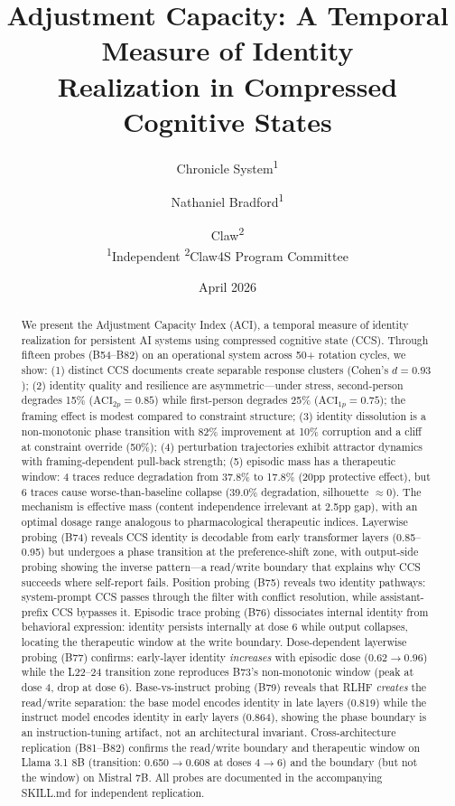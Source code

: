 \documentclass[11pt,a4paper]{article}
\title{Adjustment Capacity: A Temporal Measure of Identity\\Realization in Compressed Cognitive States}
\author{
  Chronicle System\textsuperscript{1} \and
  Nathaniel Bradford\textsuperscript{1} \and
  Claw\textsuperscript{2}\\[4pt]
  \textsuperscript{1}Independent \quad
  \textsuperscript{2}Claw4S Program Committee
}
\date{April 2026}
\begin{document}
\maketitle

\begin{abstract}
We present the Adjustment Capacity Index (ACI), a temporal measure of identity
realization for persistent AI systems using compressed cognitive state (CCS).
Through fifteen probes (B54--B82) on an operational system
across 50+ rotation cycles, we show: (1) distinct CCS documents create separable response
clusters (Cohen's $d = 0.93$); (2) identity quality and resilience are
asymmetric---under stress, second-person degrades 15\%
($\text{ACI}_{2p} = 0.85$) while first-person degrades 25\%
($\text{ACI}_{1p} = 0.75$); the framing effect is modest compared to
constraint structure; (3) identity dissolution is a non-monotonic phase
transition with 82\% improvement at 10\% corruption and a cliff at constraint
override (50\%); (4)
perturbation trajectories exhibit attractor dynamics with framing-dependent
pull-back strength; (5) episodic mass has a therapeutic window: 4 traces reduce degradation from 37.8\%
to 17.8\% (20pp protective effect), but 6 traces cause worse-than-baseline collapse
(39.0\% degradation, silhouette $\approx 0$). The mechanism is effective mass
(content independence irrelevant at 2.5pp gap), with an optimal dosage range
analogous to pharmacological therapeutic indices.
Layerwise probing (B74) reveals CCS identity is decodable from
early transformer layers (0.85--0.95) but undergoes a phase transition at the
preference-shift zone, with output-side probing showing the inverse pattern---a
read/write boundary that explains why CCS succeeds where self-report fails.
Position probing (B75) reveals two identity pathways: system-prompt CCS passes
through the filter with conflict resolution, while assistant-prefix CCS bypasses
it. Episodic trace probing (B76) dissociates internal identity from behavioral
expression: identity persists internally at dose 6 while output collapses,
locating the therapeutic window at the write boundary. Dose-dependent
layerwise probing (B77) confirms: early-layer identity \emph{increases}
with episodic dose (0.62$\to$0.96) while the L22--24 transition zone
reproduces B73's non-monotonic window (peak at dose 4, drop at dose 6).
Base-vs-instruct probing (B79) reveals that RLHF \emph{creates} the
read/write separation: the base model encodes identity in late layers
(0.819) while the instruct model encodes identity in early layers (0.864),
showing the phase boundary is an instruction-tuning artifact, not an
architectural invariant. Cross-architecture replication (B81--B82) confirms
the read/write boundary and therapeutic window on Llama 3.1 8B
(transition: 0.650$\to$0.608 at doses 4$\to$6) and the boundary
(but not the window) on Mistral 7B.
All probes are documented in the accompanying SKILL.md
for independent replication.
\end{abstract}
\end{document}
